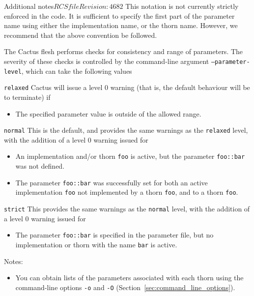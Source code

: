 \begin{cactuspart}{Additional notes}{$RCSfile$}{$Revision: 4682 $}
This notation is not currently strictly enforced in the code. It is
sufficient to specify the first part of the parameter name using either
the implementation name, or the thorn name. However, we recommend
that the above convention be followed.

The Cactus flesh performs checks for consistency and range of parameters.
The severity of these checks is controlled by the command-line argument
\texttt{--parameter-level}, which can take the following values
\begin{Lentry}
\item[\texttt{relaxed}] Cactus will issue a level 0 warning (that is, the
default behaviour will be to terminate) if
\begin{itemize}
\item{} The specified parameter value is outside of the allowed range.
\end{itemize}

\item [\texttt{normal}]
This is the default, and provides the same warnings as the
\texttt{relaxed} level, with the addition of a level 0 warning issued for
\begin{itemize}
\item{} An implementation and/or thorn \texttt{foo} is active, but the
        parameter \texttt{foo::bar} was not defined.
\item{} The parameter \texttt{foo::bar} was successfully set for both an
        active implementation \texttt{foo} not implemented by a thorn \texttt{foo},
        and to a thorn \texttt{foo}.
\end{itemize}

\item [\texttt{strict}]
This provides the same warnings as the \texttt{normal} level, with the
addition of a level 0 warning issued for
\begin{itemize}
\item{} The parameter \texttt{foo::bar} is specified in the parameter file,
        but no implementation or thorn with the name \texttt{bar} is active.
\end{itemize}
\end{Lentry}

Notes:

\begin{itemize}

\item{} You can obtain lists of the parameters associated with
each thorn using the command-line options \texttt{-o} and \texttt{-O}
(Section~\ref{sec:command_line_options}).


\end{itemize}
\end{cactuspart}
